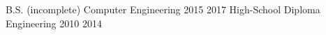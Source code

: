 {B.S. (incomplete)}
{Computer Engineering}
{2015}
{2017}
{}
{High-School Diploma}
{Engineering}
{2010}
{2014}
{}